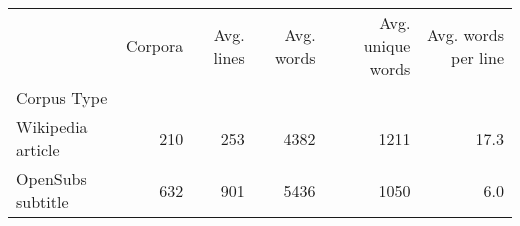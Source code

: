 \begin{tabular}{lrrrrr}
\toprule
 & Corpora & Avg. lines & Avg. words & Avg. unique words & Avg. words per line \\
Corpus Type &  &  &  &  &  \\
\midrule
Wikipedia article & 210 & 253 & 4382 & 1211 & 17.3 \\
OpenSubs subtitle & 632 & 901 & 5436 & 1050 & 6.0 \\
\bottomrule
\end{tabular}

